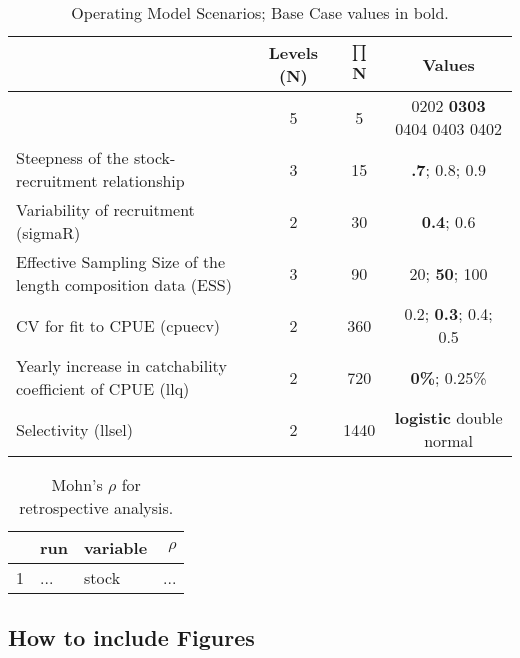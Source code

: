 \begin{table}[!ht]
\label{tab:grid}
\caption{Operating Model Scenarios; Base Case values in bold.}  
\begin{center}
\label{tab:datasumm}
\begin{tabular}{|lccc|}
\hline
& {\tiny Levels (N)} & {\tiny $\prod$ N} & {\tiny Values} \\ %
\hline\hline
{\tiny Natural mortality (M)& {\tiny 5}}  & {\tiny   5}  & {\tiny  0202  \textbf{0303} 0404 0403 0402}    \\
{\tiny Steepness of the stock-recruitment relationship}}& {\tiny 3} 	 & {\tiny 15}  & {\tiny  \textbf{.7}; 0.8; 0.9} \\
{\tiny Variability of recruitment (sigmaR)}& {\tiny 2} 	 & {\tiny  30}  & {\tiny  \textbf{0.4}; 0.6} \\
{\tiny Effective Sampling Size of the length composition data (ESS)}& {\tiny 3} & {\tiny  90}  & {\tiny  20; \textbf{50}; 100} \\
{\tiny CV for fit to CPUE (cpuecv)}& {\tiny 2} 	 & {\tiny  360}  & {\tiny  0.2;  \textbf{0.3}; 0.4; 0.5} \\
{\tiny Yearly increase in catchability coefficient of CPUE (llq)}& {\tiny 2} 	 & {\tiny   720}  & {\tiny  \textbf{0\%}; 0.25\%} \\
{\tiny Selectivity (llsel)}& {\tiny 2}}& {\tiny 1440}} & {\tiny  \textbf{logistic} double normal} \\
\hline

\end{tabular}
\end{center}
\end{table}

\begin{table}[!ht]
\caption{Mohn's $\rho$ for retrospective analysis.}  
\label{tab:retro}
\centering
\begin{tabular}{rllr}
  \hline
 & run & variable & $\rho$ \\ 
  \hline
  1 & ... & stock & ... \\ 
   \hline
\end{tabular}
\end{table}




\subsection{How to include Figures}

